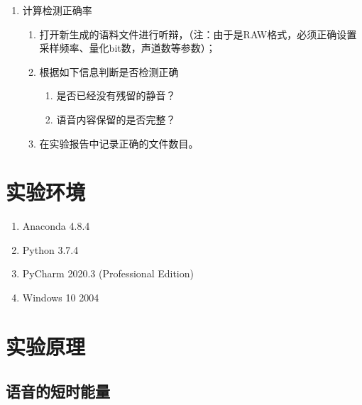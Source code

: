 \documentclass{hitreport}
\begin{document}
\begin{enumerate}
\begin{enumerate}
\end{enumerate}

\item 计算检测正确率
\begin{enumerate}
\item 打开新生成的语料文件进行听辩，（注：由于是RAW格式，必须正确设置采样频率、量化bit数，声道数等参数）；
\item 根据如下信息判断是否检测正确
\begin{enumerate}
\item 是否已经没有残留的静音？
\item 语音内容保留的是否完整？
\end{enumerate}
\item 在实验报告中记录正确的文件数目。
\end{enumerate}


\end{enumerate}

\section{实验环境}

\begin{enumerate}
\item Anaconda 4.8.4
\item Python 3.7.4
\item PyCharm 2020.3 (Professional Edition)
\item Windows 10 2004
\end{enumerate}

\section{实验原理}

\subsection{语音的短时能量}\label{sec:energy}
\end{document}
